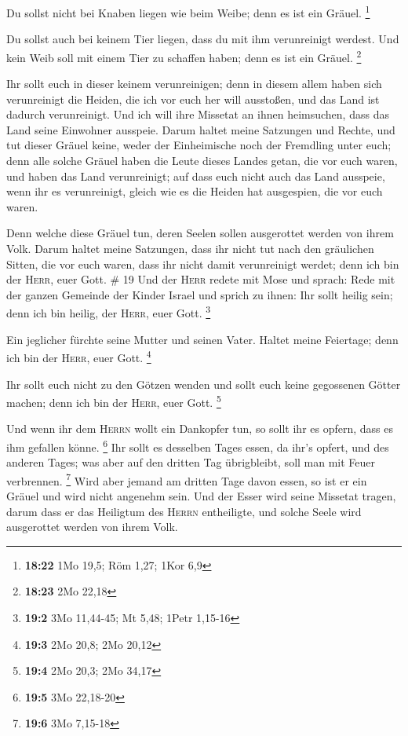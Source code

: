  Du sollst nicht bei Knaben liegen wie beim Weibe; denn
es ist ein Gräuel. \footnote{\textbf{18:22} 1Mo 19,5; Röm 1,27; 1Kor 6,9}

 Du sollst auch bei keinem Tier liegen, dass du mit ihm
verunreinigt werdest. Und kein Weib soll mit einem Tier zu schaffen
haben; denn es ist ein Gräuel. \footnote{\textbf{18:23} 2Mo 22,18}

 Ihr sollt euch in dieser keinem verunreinigen; denn in
diesem allem haben sich verunreinigt die Heiden, die ich vor euch her
will ausstoßen,  und das Land ist dadurch verunreinigt.
Und ich will ihre Missetat an ihnen heimsuchen, dass das Land seine
Einwohner ausspeie.  Darum haltet meine Satzungen und
Rechte, und tut dieser Gräuel keine, weder der Einheimische noch der
Fremdling unter euch;  denn alle solche Gräuel haben die
Leute dieses Landes getan, die vor euch waren, und haben das Land
verunreinigt;  auf dass euch nicht auch das Land
ausspeie, wenn ihr es verunreinigt, gleich wie es die Heiden hat
ausgespien, die vor euch waren.

 Denn welche diese Gräuel tun, deren Seelen sollen
ausgerottet werden von ihrem Volk.  Darum haltet meine
Satzungen, dass ihr nicht tut nach den gräulichen Sitten, die vor euch
waren, dass ihr nicht damit verunreinigt werdet; denn ich bin der
\textsc{Herr}, euer Gott. \# 19  Und der \textsc{Herr}
redete mit Mose und sprach:  Rede mit der ganzen Gemeinde
der Kinder Israel und sprich zu ihnen: Ihr sollt heilig sein; denn ich
bin heilig, der \textsc{Herr}, euer Gott. \footnote{\textbf{19:2} 3Mo
  11,44-45; Mt 5,48; 1Petr 1,15-16}

 Ein jeglicher fürchte seine Mutter und seinen Vater.
Haltet meine Feiertage; denn ich bin der \textsc{Herr}, euer Gott.
\footnote{\textbf{19:3} 2Mo 20,8; 2Mo 20,12}

 Ihr sollt euch nicht zu den Götzen wenden und sollt euch
keine gegossenen Götter machen; denn ich bin der \textsc{Herr}, euer
Gott. \footnote{\textbf{19:4} 2Mo 20,3; 2Mo 34,17}

 Und wenn ihr dem \textsc{Herrn} wollt ein Dankopfer tun,
so sollt ihr es opfern, dass es ihm gefallen könne. \footnote{\textbf{19:5}
  3Mo 22,18-20}  Ihr sollt es desselben Tages essen, da
ihr's opfert, und des anderen Tages; was aber auf den dritten Tag
übrigbleibt, soll man mit Feuer verbrennen. \footnote{\textbf{19:6} 3Mo
  7,15-18}  Wird aber jemand am dritten Tage davon essen,
so ist er ein Gräuel und wird nicht angenehm sein.  Und
der Esser wird seine Missetat tragen, darum dass er das Heiligtum des
\textsc{Herrn} entheiligte, und solche Seele wird ausgerottet werden von
ihrem Volk.

